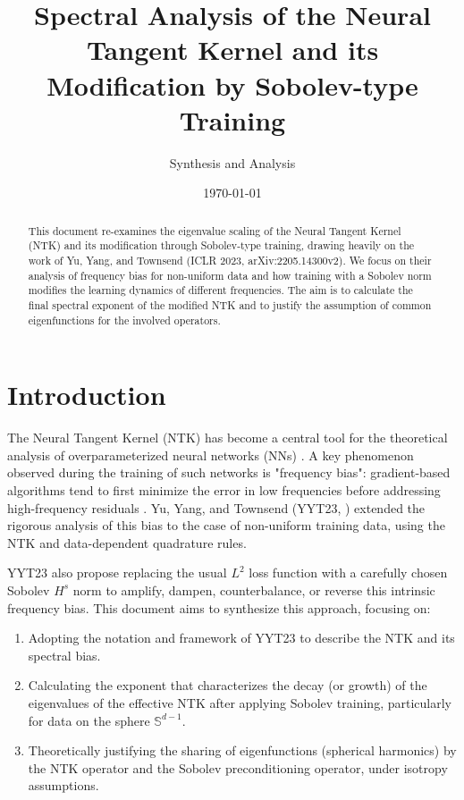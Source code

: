 \documentclass{article}
\title{Spectral Analysis of the Neural Tangent Kernel and its Modification by Sobolev-type Training}
\author{Synthesis and Analysis}
\date{\today}
\begin{document}
\maketitle

\begin{abstract}
This document re-examines the eigenvalue scaling of the Neural Tangent Kernel (NTK) and its modification through Sobolev-type training, drawing heavily on the work of Yu, Yang, and Townsend (ICLR 2023, arXiv:2205.14300v2). We focus on their analysis of frequency bias for non-uniform data and how training with a Sobolev norm modifies the learning dynamics of different frequencies. The aim is to calculate the final spectral exponent of the modified NTK and to justify the assumption of common eigenfunctions for the involved operators.
\end{abstract}

\tableofcontents
\newpage

\section{Introduction}

The Neural Tangent Kernel (NTK) has become a central tool for the theoretical analysis of overparameterized neural networks (NNs) \citep{jacot2018neural}. A key phenomenon observed during the training of such networks is "frequency bias": gradient-based algorithms tend to first minimize the error in low frequencies before addressing high-frequency residuals \citep{rahaman2019spectral, basri2020frequency}. Yu, Yang, and Townsend (YYT23, \citep{yu2022tuning}) extended the rigorous analysis of this bias to the case of non-uniform training data, using the NTK and data-dependent quadrature rules.

YYT23 also propose replacing the usual $L^2$ loss function with a carefully chosen Sobolev $H^s$ norm to amplify, dampen, counterbalance, or reverse this intrinsic frequency bias. This document aims to synthesize this approach, focusing on:
\begin{enumerate}
    \item Adopting the notation and framework of YYT23 to describe the NTK and its spectral bias.
    \item Calculating the exponent that characterizes the decay (or growth) of the eigenvalues of the effective NTK after applying Sobolev training, particularly for data on the sphere $\mathbb{S}^{d-1}$.
    \item Theoretically justifying the sharing of eigenfunctions (spherical harmonics) by the NTK operator and the Sobolev preconditioning operator, under isotropy assumptions.
\end{enumerate}
\end{document}
